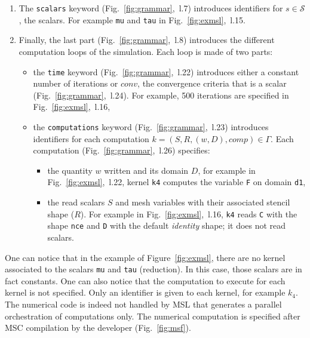\begin{enumerate}
\item The \texttt{scalars} keyword (Fig.~\ref{fig:grammar},~l.7) introduces identifiers for $s\in\mathcal{S}$, the scalars. For example \texttt{mu} and \texttt{tau} in Fig.~\ref{fig:exmsl},~l.15. 

\item Finally, the last part (Fig.~\ref{fig:grammar},~l.8) introduces the different computation loops of the simulation. Each loop is made of two parts:
\begin{itemize}
\item the \texttt{time} keyword (Fig.~\ref{fig:grammar},~l.22) introduces either a constant number of iterations or $conv$, the convergence criteria that is a scalar (Fig.~\ref{fig:grammar},~l.24). For example, 500 iterations are specified in Fig.~\ref{fig:exmsl},~l.16,
\item the \texttt{computations} keyword (Fig.~\ref{fig:grammar},~l.23) introduces identifiers for each computation $k=(S,R,(w,D),comp) \in \Gamma$. Each computation (Fig.~\ref{fig:grammar},~l.26) specifies:
\begin{itemize}
 \item the quantity $w$ written and its domain $D$, for example in Fig.~\ref{fig:exmsl},~l.22, kernel \texttt{k4} computes the variable \texttt{F} on domain \texttt{d1},
 \item the read scalars $S$ and mesh variables with their associated stencil shape ($R$). For example in Fig.~\ref{fig:exmsl},~l.16, \texttt{k4} reads \texttt{C} with the shape \texttt{nce} and \texttt{D} with the default \textit{identity} shape; it does not read scalars.
 \end{itemize}
\end{itemize}
\end{enumerate}

One can notice that in the example of Figure~\ref{fig:exmsl}, there are no kernel associated to the scalars \texttt{mu} and \texttt{tau} (reduction).
In this case, those scalars are in fact constants.
One can also notice that the computation to execute for each kernel is not specified. Only an identifier is given to each kernel, for example $k_4$. The numerical code is indeed not handled by MSL that generates a parallel orchestration of computations only. The numerical computation is specified after MSC compilation by the developer (Fig.~\ref{fig:msf}).
